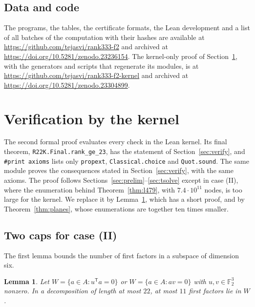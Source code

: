 \documentclass[11pt]{amsart}
\newtheorem{lemma}[theorem]{Lemma}
\theoremstyle{definition}
\theoremstyle{remark}
\numberwithin{equation}{section}
\newcommand{\F}{\mathbb{F}_2}
\begin{document}
\subsection{Data and code}
The programs, the tables, the certificate formats, the Lean development and a list of all batches of the computation with their hashes are available at \url{https://github.com/tejasvi/rank333-f2} and archived at \url{https://doi.org/10.5281/zenodo.23236154}. The kernel-only proof of Section~\ref{sec:kernel}, with the generators and scripts that regenerate its modules, is at \url{https://github.com/tejasvi/rank333-f2-kernel} and archived at \url{https://doi.org/10.5281/zenodo.23304899}.

\section{Verification by the kernel}\label{sec:kernel}

The second formal proof evaluates every check in the Lean kernel. Its final theorem, \texttt{R22K.Final.rank\_ge\_23}, has the statement of Section~\ref{sec:verify}, and \texttt{\#print axioms} lists only \texttt{propext}, \texttt{Classical.choice} and \texttt{Quot.sound}. The same module proves the consequences stated in Section~\ref{sec:verify}, with the same axioms. The proof follows Sections~\ref{sec:prelim}--\ref{sec:tsolve} except in case (II), where the enumeration behind Theorem~\ref{thm:l479}, with $7.4\cdot 10^{11}$ nodes, is too large for the kernel. We replace it by Lemma~\ref{lem:W}, which has a short proof, and by Theorem~\ref{thm:planes}, whose enumerations are together ten times smaller.

\subsection{Two caps for case (II)}
The first lemma bounds the number of first factors in a subspace of dimension six.

\begin{lemma}\label{lem:W}
Let $W=\{a\in A: u^{\mathsf T}a=0\}$ or $W=\{a\in A: av=0\}$ with $u,v\in\F^3$ nonzero. In a decomposition of length at most $22$, at most $11$ first factors lie in $W$.
\end{lemma}
\end{document}

